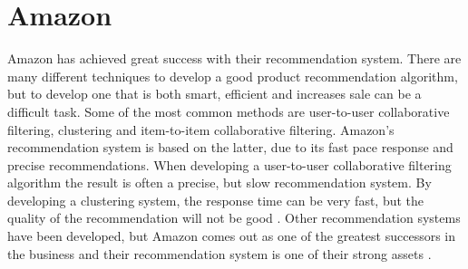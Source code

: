 \section{Amazon}
Amazon has achieved great success with their recommendation system. There are many different techniques to develop a good product recommendation algorithm, but to develop one that is both smart, efficient and increases sale can be a difficult task. Some of the most common methods are user-to-user collaborative filtering, clustering and item-to-item collaborative filtering. Amazon's recommendation system is based on the latter, due to its fast pace response and precise recommendations. When developing a user-to-user collaborative filtering algorithm the result is often a precise, but slow recommendation system. By developing a clustering system, the response time can be very fast, but the quality of the recommendation will not be good \cite{AmazonRecommendations}. Other recommendation systems have been developed, but Amazon comes out as one of the greatest successors in the business and their recommendation system is one of their strong assets \cite{AmazonSuccess2}.
